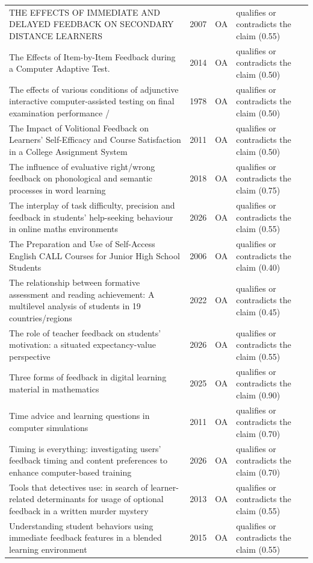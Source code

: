 \begin{longtable}{@{}%
  >{\raggedright\arraybackslash}p{}c%
  >{\raggedright\arraybackslash}p{}%
  >{\raggedright\arraybackslash}p{}@{}}
THE EFFECTS OF IMMEDIATE AND DELAYED FEEDBACK ON SECONDARY DISTANCE LEARNERS & 2007 & OA & qualifies or contradicts the claim (0.55) \\
The Effects of Item-by-Item Feedback during a Computer Adaptive Test. & 2014 & OA & qualifies or contradicts the claim (0.50) \\
The effects of various conditions of adjunctive interactive computer-assisted testing on final examination performance / & 1978 & OA & qualifies or contradicts the claim (0.50) \\
The Impact of Volitional Feedback on Learners' Self-Efficacy and Course Satisfaction in a College Assignment System & 2011 & OA & qualifies or contradicts the claim (0.50) \\
The influence of evaluative right/wrong feedback on phonological and semantic processes in word learning & 2018 & OA & qualifies or contradicts the claim (0.75) \\
The interplay of task difficulty, precision and feedback in students' help-seeking behaviour in online maths environments & 2026 & OA & qualifies or contradicts the claim (0.55) \\
The Preparation and Use of Self-Access English CALL Courses for Junior High School Students & 2006 & OA & qualifies or contradicts the claim (0.40) \\
The relationship between formative assessment and reading achievement: A multilevel analysis of students in 19 countries/regions & 2022 & OA & qualifies or contradicts the claim (0.45) \\
The role of teacher feedback on students' motivation: a situated expectancy-value perspective & 2026 & OA & qualifies or contradicts the claim (0.55) \\
Three forms of feedback in digital learning material in mathematics & 2025 & OA & qualifies or contradicts the claim (0.90) \\
Time advice and learning questions in computer simulations & 2011 & OA & qualifies or contradicts the claim (0.70) \\
Timing is everything: investigating users' feedback timing and content preferences to enhance computer-based training & 2026 & OA & qualifies or contradicts the claim (0.70) \\
Tools that detectives use: in search of learner-related determinants for usage of optional feedback in a written murder mystery & 2013 & OA & qualifies or contradicts the claim (0.55) \\
Understanding student behaviors using immediate feedback features in a blended learning environment & 2015 & OA & qualifies or contradicts the claim (0.55) \\

\end{longtable}
